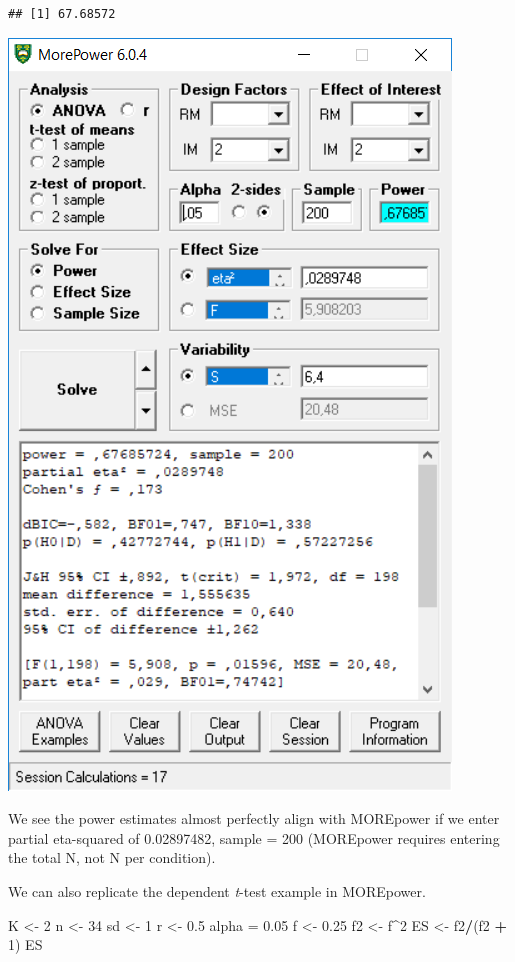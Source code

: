 \documentclass[]{book}
\newenvironment{Shaded}{\begin{snugshade}}{\end{snugshade}}
\newcommand{\DecValTok}[1]{\textcolor[rgb]{0.00,0.00,0.81}{#1}}
\newcommand{\FloatTok}[1]{\textcolor[rgb]{0.00,0.00,0.81}{#1}}
\newcommand{\NormalTok}[1]{#1}
\newcommand{\OperatorTok}[1]{\textcolor[rgb]{0.81,0.36,0.00}{\textbf{#1}}}
\newcommand{\StringTok}[1]{\textcolor[rgb]{0.31,0.60,0.02}{#1}}
\begin{document}
\begin{verbatim}
## [1] 67.68572
\end{verbatim}

\includegraphics{screenshots/morepower_1.png}

We see the power estimates almost perfectly align with MOREpower if we enter partial eta-squared of 0.02897482, sample = 200 (MOREpower requires entering the total N, not N per condition).

We can also replicate the dependent \emph{t}-test example in MOREpower.

\begin{Shaded}
\begin{Highlighting}[]
\NormalTok{K <-}\StringTok{ }\DecValTok{2}
\NormalTok{n <-}\StringTok{ }\DecValTok{34}
\NormalTok{sd <-}\StringTok{ }\DecValTok{1}
\NormalTok{r <-}\StringTok{ }\FloatTok{0.5}
\NormalTok{alpha =}\StringTok{ }\FloatTok{0.05}
\NormalTok{f <-}\StringTok{ }\FloatTok{0.25}
\NormalTok{f2 <-}\StringTok{ }\NormalTok{f}\OperatorTok{^}\DecValTok{2}
\NormalTok{ES <-}\StringTok{ }\NormalTok{f2}\OperatorTok{/}\NormalTok{(f2 }\OperatorTok{+}\StringTok{ }\DecValTok{1}\NormalTok{)}
\NormalTok{ES}
\end{Highlighting}
\end{Shaded}
\end{document}
